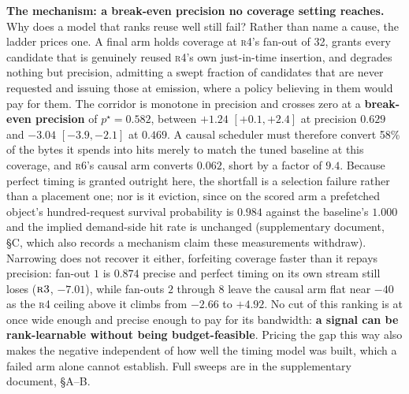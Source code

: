 \documentclass[letterpaper]{article} %
\newcommand{\rung}[1]{\textsc{#1}}
\begin{document}
\textbf{The mechanism: a break-even precision no coverage setting reaches.} Why does a model that ranks reuse well still fail? Rather than name a cause, the ladder prices one. A final arm holds coverage at \rung{r4}'s fan-out of 32, grants every candidate that is genuinely reused \rung{r4}'s own just-in-time insertion, and degrades nothing but precision, admitting a swept fraction of candidates that are never requested and issuing those at emission, where a policy believing in them would pay for them. The corridor is monotone in precision and crosses zero at a \textbf{break-even precision} of $p^{\star}=0.582$, between $+1.24$ $[+0.1,+2.4]$ at precision $0.629$ and $-3.04$ $[-3.9,-2.1]$ at $0.469$. A causal scheduler must therefore convert 58\% of the bytes it spends into hits merely to match the tuned baseline at this coverage, and \rung{r6}'s causal arm converts $0.062$, short by a factor of $9.4$. Because perfect timing is granted outright here, the shortfall is a selection failure rather than a placement one; nor is it eviction, since on the scored arm a prefetched object's hundred-request survival probability is $0.984$ against the baseline's $1.000$ and the implied demand-side hit rate is unchanged (supplementary document, \S C, which also records a mechanism claim these measurements withdraw). Narrowing does not recover it either, forfeiting coverage faster than it repays precision: fan-out $1$ is $0.874$ precise and perfect timing on its own stream still loses ($\rung{r3}$, $-7.01$), while fan-outs $2$ through $8$ leave the causal arm flat near $-40$ as the \rung{r4} ceiling above it climbs from $-2.66$ to $+4.92$. No cut of this ranking is at once wide enough and precise enough to pay for its bandwidth: \textbf{a signal can be rank-learnable without being budget-feasible}. Pricing the gap this way also makes the negative independent of how well the timing model was built, which a failed arm alone cannot establish. Full sweeps are in the supplementary document, \S A--B.
\end{document}
